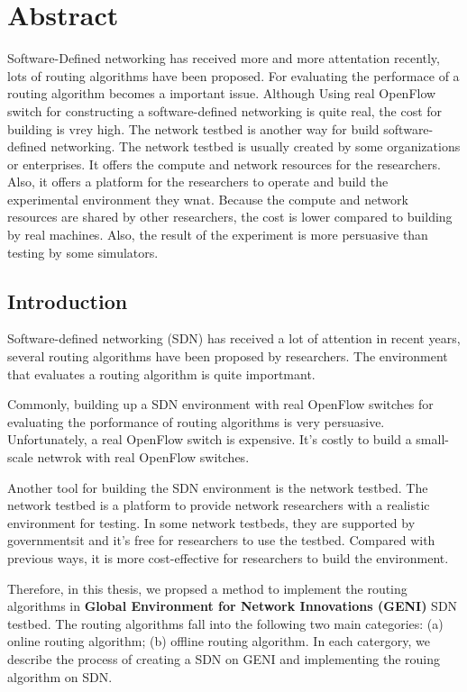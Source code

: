 \documentclass[a4paper,12pt]{report}
\begin{document}
\begin{CJK*}{UTF8}{bkai}
  \chapter*{Abstract}
  \qquad Software-Defined networking has received more and more attentation recently, lots of routing algorithms have been proposed. For evaluating the performace of a routing algorithm becomes a important issue. Although Using real OpenFlow switch for constructing a software-defined networking is quite real, the cost for building is vrey high. The network testbed is another way for build software-defined networking. The network testbed is usually created by some organizations or enterprises. It offers the compute and network resources for the researchers. Also, it offers a platform for the researchers to operate and build the experimental environment they wnat. Because the compute and network resources are shared by other researchers, the cost is lower compared to building by real machines. Also, the result of the experiment is more persuasive than testing by some simulators. 
  \begin{large}
  \tableofcontents{}
  \chapter{Introduction}
  \setcounter{page}{1}
	    \qquad Software-defined networking (SDN) has received a lot of attention in recent years, 
	            several routing algorithms have been proposed by researchers. The environment that evaluates a 
	            routing algorithm is quite importmant.\par
	    \qquad Commonly, building up a SDN environment with real OpenFlow switches for evaluating the porformance
	            of routing algorithms is very persuasive. Unfortunately, a real OpenFlow switch is expensive. It's 
	            costly to build a small-scale netwrok with real OpenFlow switches.\par
	    \qquad Another tool for building the SDN environment is the network testbed. The network testbed is a 
	            platform to provide network researchers with a realistic environment for testing. In some network testbeds, they are supported by governmentsit and it's free for researchers to use the testbed. Compared with previous ways, it is more cost-effective for researchers to build the environment.\par
	    \qquad Therefore, in this thesis, we propsed a method to implement the routing algorithms in {\bf Global 
	            Environment for Network Innovations (GENI)} SDN testbed. The routing algorithms fall into the following two main categories: (a) online routing algorithm; (b) offline routing algorithm. In each catergory, we describe the process of creating a SDN on GENI and implementing the rouing algorithm on SDN. 

\end{large}
\end{CJK*}
\end{document}
